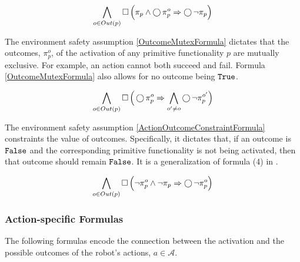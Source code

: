 \begin{equation}\label{PropositionDeactivationFormula}
	\bigwedge \limits_{o \in Out(p)} \operatorname{\Box} \Big( \pi_p \wedge \operatorname{\bigcirc} \pi_p^o \Rightarrow \operatorname{\bigcirc} \lnot \pi_p \Big)
\end{equation}

The environment safety assumption \eqref{OutcomeMutexFormula} dictates that the outcomes, $\pi_p^o$, of the activation of any primitive functionality $p$ are mutually exclusive. 
For example, an action cannot both succeed and fail.
Formula \eqref{OutcomeMutexFormula} also allows for no outcome being $\mathtt{True}$.

\begin{equation}\label{OutcomeMutexFormula}
	\bigwedge \limits_{o \in Out(p)} \operatorname{\Box} \Big( \operatorname{\bigcirc} \pi_p^o \Rightarrow \bigwedge \limits_{o^\prime \neq o} \operatorname{\bigcirc} \lnot \pi_p^{o^\prime} \Big)
\end{equation}

The environment safety assumption \eqref{ActionOutcomeConstraintFormula} constraints the value of outcomes.
Specifically, it dictates that, if an outcome is $\mathtt{False}$ and the corresponding primitive functionality is not being activated, then that outcome should remain $\mathtt{False}$.
It is a generalization of formula (4) in \cite{Vasu2013ICRA}.

\begin{equation}\label{ActionOutcomeConstraintFormula}
	\bigwedge \limits_{o \in Out(p)} \operatorname{\Box} \Big( \lnot \pi_p^o \wedge \lnot \pi_p \Rightarrow \operatorname{\bigcirc} \lnot \pi_p^o \Big)
\end{equation}


\subsubsection{Action-specific Formulas}

The following formulas encode the connection between the activation and the possible outcomes of the robot's actions, $a \in \mathcal{A}$.


